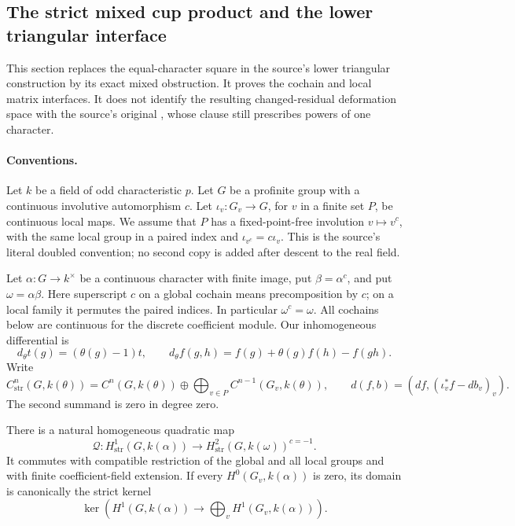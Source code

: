 \subsection{The strict mixed cup product and the lower triangular interface}
\label{sec:cubic-strict-mixed-cup}

This section replaces the equal-character square in the source's lower
triangular construction by its exact mixed obstruction.  It proves the
cochain and local matrix interfaces.  It does not identify the resulting
changed-residual deformation space with the source's original
, whose  clause still prescribes powers of
one character.

\paragraph{Conventions.}
Let \(k\) be a field of odd characteristic \(p\).  Let \(G\) be a profinite
group with a continuous involutive automorphism \(c\).  Let
\(\iota_v:G_v\to G\), for \(v\) in a finite set \(P\), be continuous local
maps.  We assume that \(P\) has a fixed-point-free involution \(v\mapsto
v^c\), with the same local group in a paired index and
\(\iota_{v^c}=c\iota_v\).  This is the source's literal doubled
 convention; no second copy is added after descent to
the real field.

Let \(\alpha:G\to k^\times\) be a continuous character with finite image,
put \(\beta=\alpha^c\), and put \(\omega=\alpha\beta\).
Here superscript \(c\) on a global cochain means precomposition by \(c\);
on a local family it permutes the paired indices.  In particular
\(\omega^c=\omega\).
All cochains below are continuous for the discrete coefficient module.
Our inhomogeneous differential is
\[
 d_\theta t(g)=(\theta(g)-1)t,\qquad
 d_\theta f(g,h)=f(g)+\theta(g)f(h)-f(gh).
 \tag{G90.1}
\]
Write
\[
 C_{\mathrm{str}}^n(G,k(\theta))
 =C^n(G,k(\theta))\oplus\bigoplus_{v\in P}C^{n-1}(G_v,k(\theta)),
 \qquad
 d(f,b)=(df,(\iota_v^*f-db_v)_v).
 \tag{G90.2}
\]
The second summand is zero in degree zero.

\begin{proposition}
\label{AC-G90-cup}
There is a natural homogeneous quadratic map
\[
 \mathcal Q:H^1_{\mathrm{str}}(G,k(\alpha))
       \longrightarrow H^2_{\mathrm{str}}(G,k(\omega))^{c=-1}.
 \tag{G90.3}
\]
It commutes with compatible restriction of the global and all local
groups and with finite coefficient-field extension.
If every \(H^0(G_v,k(\alpha))\) is zero, its domain is canonically the
strict kernel
\[
 \ker\!\left(H^1(G,k(\alpha))\longrightarrow
                 \bigoplus_v H^1(G_v,k(\alpha))\right).
 \tag{G90.4}
\]
\end{proposition}


